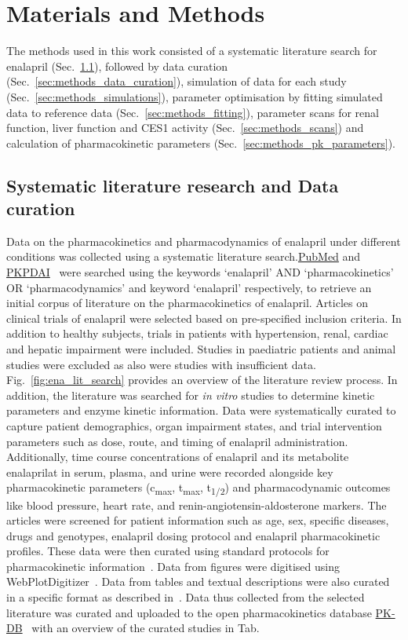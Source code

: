 \documentclass[pharmaceutics,article,submit,pdftex,moreauthors]{Definitions/mdpi}
\begin{document}
\section{Materials and Methods}
The methods used in this work consisted of a systematic literature search for enalapril (Sec.~\ref{sec:methods_lit_search_data_curate}), followed by data curation (Sec.~\ref{sec:methods_data_curation}), simulation of data for each study (Sec.~\ref{sec:methods_simulations}), parameter optimisation by fitting simulated data to reference data (Sec.~\ref{sec:methods_fitting}), parameter scans for renal function, liver function and CES1 activity (Sec.~\ref{sec:methods_scans}) and calculation of pharmacokinetic parameters (Sec.~\ref{sec:methods_pk_parameters}).

\subsection{Systematic literature research and Data curation}\label{sec:methods_lit_search_data_curate} 
Data on the pharmacokinetics and pharmacodynamics of enalapril under different conditions was collected using a systematic literature search.\@ \href{https://pubmed.ncbi.nlm.nih.gov/}{PubMed} and \href{https://www.pkpdai.com/}{PKPDAI}~\cite{GonzalezHernandez2021} were searched using the keywords `enalapril' AND `pharmacokinetics' OR `pharmacodynamics' and keyword `enalapril' respectively, to retrieve an initial corpus of literature on the pharmacokinetics of enalapril. Articles on clinical trials of enalapril were selected based on pre-specified inclusion criteria. In addition to healthy subjects, trials in patients with hypertension, renal, cardiac and hepatic impairment were included. Studies in paediatric patients and animal studies were excluded as also were studies with insufficient data. Fig.~\ref{fig:ena_lit_search} provides an overview of the literature review process. In addition, the literature was searched for \textit{in vitro} studies to determine kinetic parameters and enzyme kinetic information. Data were systematically curated to capture patient demographics, organ impairment states, and trial intervention parameters such as dose, route, and timing of enalapril administration. Additionally, time course concentrations of enalapril and its metabolite enalaprilat in serum, plasma, and urine were recorded alongside key pharmacokinetic parameters (c\textsubscript{max}, t\textsubscript{max}, t\textsubscript{1/2}) and pharmacodynamic outcomes like blood pressure, heart rate, and renin-angiotensin-aldosterone markers. The articles were screened for patient information such as age, sex, specific diseases, drugs and genotypes, enalapril dosing protocol and enalapril pharmacokinetic profiles. These data were then curated using standard protocols for pharmacokinetic information~\cite{Grzegorzewski2021}. Data from figures were digitised using WebPlotDigitizer~\cite{Rohatgi2024}. Data from tables and textual descriptions were also curated in a specific format as described in~\cite{Grzegorzewski2021}. Data thus collected from the selected literature was curated and uploaded to the open pharmacokinetics database \href{https://alpha.pk-db.com/}{PK-DB}~\cite{Grzegorzewski2021} with an overview of the curated studies in Tab.
\end{document}
